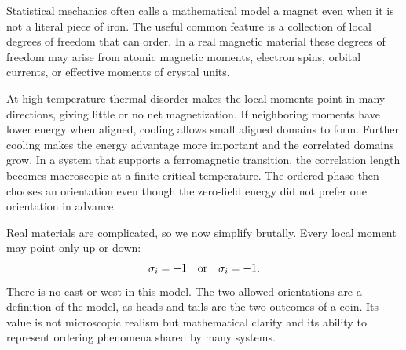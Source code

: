 Statistical mechanics often calls a mathematical model a magnet even when it
is not a literal piece of iron.  The useful common feature is a collection of
local degrees of freedom that can order.  In a real magnetic material these
degrees of freedom may arise from atomic magnetic moments, electron spins,
orbital currents, or effective moments of crystal units.

At high temperature thermal disorder makes the local moments point in many
directions, giving little or no net magnetization.  If neighboring moments
have lower energy when aligned, cooling allows small aligned domains to form.
Further cooling makes the energy advantage more important and the correlated
domains grow.  In a system that supports a ferromagnetic transition, the
correlation length becomes macroscopic at a finite critical temperature.
The ordered phase then chooses an orientation even though the zero-field
energy did not prefer one orientation in advance.

\begin{classroomqa}
\end{classroomqa}

\begin{classroomqa}
\end{classroomqa}

Real materials are complicated, so we now simplify brutally.  Every local
moment may point only up or down:
\begin{equation}
 \sigma_i=+1\quad\hbox{or}\quad\sigma_i=-1.
 \label{eq:sm8-ising-spin}
\end{equation}
There is no east or west in this model.  The two allowed orientations are a
definition of the model, as heads and tails are the two outcomes of a coin.
Its value is not microscopic realism but mathematical clarity and its ability
to represent ordering phenomena shared by many systems.

